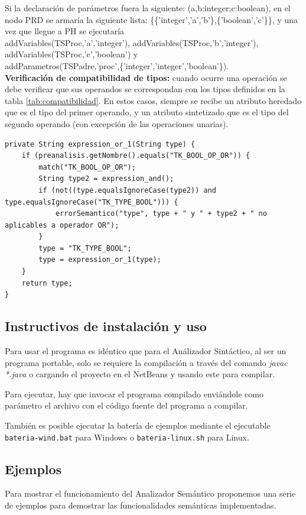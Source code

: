 Si la declaración de parámetros fuera la siguiente: (a,b:integer;c:boolean), en el nodo PRD se armaría la siguiente lista: \{\{'integer','a','b'\},\{'boolean','c'\}\}, y una vez que llegue a PH se ejecutaría \\ 
addVariables(TSProc,'a','integer'), addVariables(TSProc,'b','integer'), addVariables(TSProc,'c','boolean') y \\ addParametros(TSPadre,'proc',\{'integer','integer','boolean'\}). 
\\

\textbf{Verificación de compatibilidad de tipos:} cuando ocurre una operación se debe verificar que sus operandos se correspondan con los tipos definidos en la tabla \ref{tab:compatibilidad}. En estos casos, siempre se recibe un atributo heredado que es el tipo del primer operando, y un atributo sintetizado que es el tipo del segundo operando (con excepción de las operaciones unarias).

\begin{verbatim}
private String expression_or_1(String type) {
	if (preanalisis.getNombre().equals("TK_BOOL_OP_OR")) {
		match("TK_BOOL_OP_OR");
		String type2 = expression_and();
		if (not((type.equalsIgnoreCase(type2)) and type.equalsIgnoreCase("TK_TYPE_BOOL"))) {
			errorSemantico("type", type + " y " + type2 + " no aplicables a operador OR");
		}
		type = "TK_TYPE_BOOL";
		type = expression_or_1(type);
	}
	return type;
}
\end{verbatim}

\subsection{Instructivos de instalación y uso}
Para usar el programa es idéntico que para el Análizador Sintáctico, al ser un programa portable, solo se requiere la compilación a través del comando \emph{javac *.java} o cargando el proyecto en el NetBeans y usando este para compilar.

Para ejecutar, hay que invocar el programa compilado enviándole como parámetro el archivo con el código fuente del programa a compilar.

También es posible ejecutar la batería de ejemplos mediante el ejecutable \texttt{bateria-wind.bat} para Windows o \texttt{bateria-linux.sh} para Linux.

\subsection{Ejemplos}
Para mostrar el funcionamiento del Analizador Semántico proponemos una serie de ejemplos para demostrar las funcionalidades semánticas implementadas.

